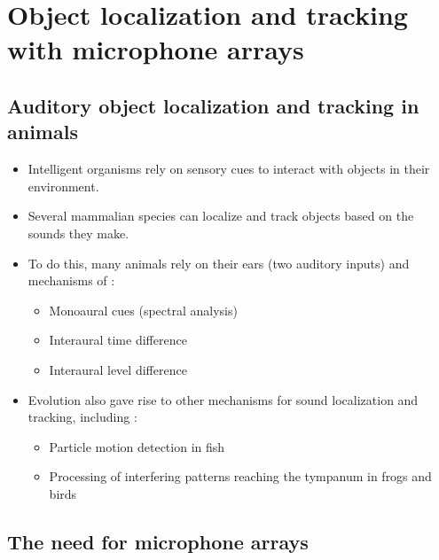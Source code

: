 \documentclass[14pt, oneside]{extarticle}
\begin{document}
\section{Object localization and tracking with microphone arrays}

\subsection{Auditory object localization and tracking in animals}

\begin{itemize}

\item Intelligent organisms rely on sensory cues to interact with objects in their environment. 

\item Several mammalian species can localize and track objects based on the sounds they make.

\item To do this, many animals rely on their ears (two auditory inputs) and mechanisms of \cite{grothe2010mechanisms}:
	\begin{itemize}
	\item Monoaural cues (spectral analysis)
	\item Interaural time difference
	\item Interaural level difference
	\end{itemize}

\item Evolution also gave rise to other mechanisms for sound localization and tracking, including \cite{grothe2010mechanisms}: 
	\begin{itemize}
	\item Particle motion detection in fish 
	\item Processing of interfering patterns reaching the tympanum in frogs and birds
	\end{itemize}

\end{itemize}

\subsection{The need for microphone arrays}
\end{document}

